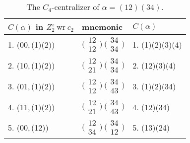 \documentclass{surv-l}
\numberwithin{equation}{section}
\numberwithin{table}{section}
\numberwithin{figure}{section}
\theoremstyle{definition}
\begin{document}
\begin{table}
\caption{The $C_{4}$-centralizer of $\alpha=(12)(34)$.\label{tab4.12.2}}
{\begin{tabular}{@{}|l|l|l|@{}}
\hline
\multicolumn{1}{|l|}{$C(\alpha)$ in $Z_{2}^{z}\  \mathrm{wr} \ c_{2}$}&    \multicolumn{1}{|l|}{mnemonic}& \multicolumn{1}{|l|}{$C(\alpha)$}   \\
\hline
1. (00,\,(1)(2)) &$\big(\!\begin{smallmatrix}12 \\ 12\end{smallmatrix}\!\big)\ \big(\!\begin{smallmatrix}34 \\ 34\end{smallmatrix}\!\big)$ &1. (1)(2)(3)(4) \\[3pt]
2. (10,\,(1)(2)) &$\big(\!\begin{smallmatrix}12 \\ 21\end{smallmatrix}\!\big)\ \big(\!\begin{smallmatrix}34 \\ 34\end{smallmatrix}\!\big)$ &2. (12)(3)(4) \\[3pt]
3. (01,\,(1)(2)) &$\big(\!\begin{smallmatrix}12 \\ 12\end{smallmatrix}\!\big)\ \big(\!\begin{smallmatrix}34 \\ 43\end{smallmatrix}\!\big)$ &3. (1)(2)(34) \\[3pt]
4. (11,\,(1)(2)) &$\big(\!\begin{smallmatrix}12 \\ 21\end{smallmatrix}\!\big)\ \big(\!\begin{smallmatrix}34 \\ 43\end{smallmatrix}\!\big)$ &4. (12)(34) \\[3pt]
5. (00,\,(12)) &$\big(\!\begin{smallmatrix}12 \\ 34\end{smallmatrix}\!\big)\ \big(\!\begin{smallmatrix}34 \\ 12\end{smallmatrix}\!\big)$ &5. (13)(24) \\[3pt]

\end{tabular}}
\end{table}
\end{document}
